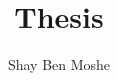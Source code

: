 \documentclass[11pt]{article}
\title{Thesis}
\author{Shay Ben Moshe}
\numberwithin{equation}{subsection}
\theoremstyle{definition}
\theoremstyle{remark}
\begin{document}
	\maketitle
	
	\tableofcontents
	
	
	
	
	
	{}
	
\end{document}
